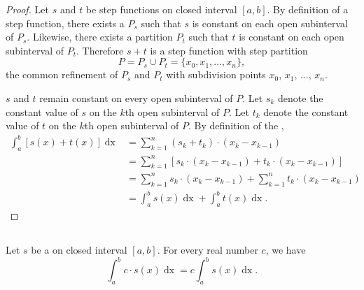 \documentclass{report}
\begin{document}
\begin{proof}

  Let $s$ and $t$ be step functions on closed interval $[a, b]$.
  By definition of a step function, there exists a 
    $P_s$ such that $s$ is constant on each open subinterval of $P_s$.
  Likewise, there exists a partition $P_t$ such that $t$ is constant on each
    open subinterval of $P_t$.
  Therefore $s + t$ is a step function with step partition
    $$P = P_s \cup P_t = \{x_0, x_1, \ldots, x_n\},$$ the common refinement of
    $P_s$ and $P_t$ with subdivision points $x_0$, $x_1$, $\ldots$, $x_n$.

  $s$ and $t$ remain constant on every open subinterval of $P$.
  Let $s_k$ denote the constant value of $s$ on the $k$th open subinterval of
    $P$.
  Let $t_k$ denote the constant value of $t$ on the $k$th open subinterval of
    $P$.
  By definition of the ,
    \begin{align*}
      \int_a^b \left[ s(x) + t(x) \right] \mathop{dx}
        & = \sum_{k=1}^n (s_k + t_k) \cdot (x_k - x_{k-1}) \\
        & = \sum_{k=1}^n \left[ s_k \cdot (x_k - x_{k-1}) +
                                t_k \cdot (x_k - x_{k-1}) \right] \\
        & = \sum_{k=1}^n s_k \cdot (x_k - x_{k-1}) +
            \sum_{k=1}^n t_k \cdot (x_k - x_{k-1}) \\
        & = \int_a^b s(x) \mathop{dx} + \int_a^b t(x) \mathop{dx}.
    \end{align*}

\end{proof}

\subsection{}%
\label{sub:step-homogeneous-property}
\label{sub:theorem-1.3}

\begin{theorem}[1.3]

  Let $s$ be a  on closed interval $[a, b]$.
  For every real number $c$, we have
    $$\int_a^b c \cdot s(x) \mathop{dx} = c\int_a^b s(x) \mathop{dx}.$$

\end{theorem}
\end{document}
